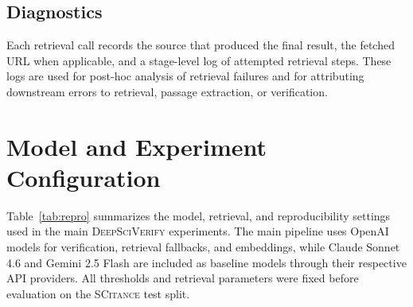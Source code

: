 \documentclass{article}
\theoremstyle{plain}
\theoremstyle{definition}
\theoremstyle{remark}
\begin{document}
\subsection{Diagnostics}
\label{app:retrieval_diagnostics}

Each retrieval call records the source that produced the final result, the fetched URL when applicable, and a stage-level log of attempted retrieval steps. These logs are used for post-hoc analysis of retrieval failures and for attributing downstream errors to retrieval, passage extraction, or verification.


\section{Model and Experiment Configuration}
\label{app:model_config}

Table~\ref{tab:repro} summarizes the model, retrieval, and reproducibility settings used in the main \textsc{DeepSciVerify} experiments. The main pipeline uses OpenAI models for verification, retrieval fallbacks, and embeddings, while Claude Sonnet 4.6 and Gemini 2.5 Flash are included as baseline models through their respective API providers. All thresholds and retrieval parameters were fixed before evaluation on the \textsc{SCitance} test split.
\end{document}
